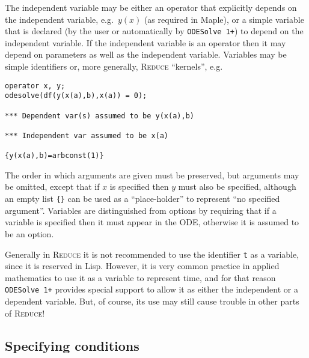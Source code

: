 \documentclass[a4paper]{article} %
\newcommand{\ODESolve}[1]{\texttt{ODESolve\,#1}}
\newcommand{\REDUCE}{\textsc{Reduce}}
\begin{document}
The independent variable may be either an operator that explicitly
depends on the independent variable, e.g.\ $y(x)$ (as required in
Maple), or a simple variable that is declared (by the user or
automatically by \ODESolve{1+}) to depend on the independent variable.
If the independent variable is an operator then it may depend on
parameters as well as the independent variable.  Variables may be
simple identifiers or, more generally, \REDUCE{} ``kernels'', e.g.
\begin{verbatim}
operator x, y;
odesolve(df(y(x(a),b),x(a)) = 0);

*** Dependent var(s) assumed to be y(x(a),b)

*** Independent var assumed to be x(a)

{y(x(a),b)=arbconst(1)}
\end{verbatim}

The order in which arguments are given must be preserved, but
arguments may be omitted, except that if $x$ is specified then $y$
must also be specified, although an empty list \verb|{}| can be used
as a ``place-holder'' to represent ``no specified argument''.
Variables are distinguished from options by requiring that if a
variable is specified then it must appear in the ODE, otherwise it is
assumed to be an option.

Generally in \REDUCE{} it is not recommended to use the identifier
\verb|t| as a variable, since it is reserved in Lisp.  However, it is
very common practice in applied mathematics to use it as a variable to
represent time, and for that reason \ODESolve{1+} provides special
support to allow it as either the independent or a dependent variable.
But, of course, its use may still cause trouble in other parts of
\REDUCE!


\subsection{Specifying conditions}
\end{document}
